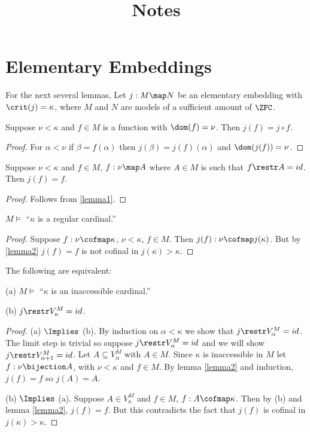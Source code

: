 \documentclass[oneside,12pt]{amsart}
\begin{document}
\title{Notes}

\maketitle

\tableofcontents

\section{Elementary Embeddings}

For the next several lemmas, Let $j:M \map N$ be an elementary embedding with $\crit(j)=\kappa$, where $M$ and $N$ are models of a sufficient amount of $\ZFC$.

\begin{lemma}
\label{lemma1}
Suppose $\nu<\kappa$ and $f\in M$ is a function with $\dom(f) = \nu$. Then $j(f) = j \circ f$.
\end{lemma}
\begin{proof}
For  $\alpha < \nu$ if $\beta = f(\alpha)$ then $j(\beta) = j(f)(\alpha)$ and $\dom(j(f)) = \nu$.
\end{proof}

\begin{lemma}
\label{lemma2}
Suppose $\nu<\kappa$ and $f\in M$, $f:\nu \map A$ where $A\in M$ is such that $f\restr A = id$.
Then $j(f) = f$.
\end{lemma}
\begin{proof}
Follows from \ref{lemma1}.
\end{proof}

\begin{lemma}
$M\models$ ``$\kappa$ is a regular cardinal.''
\end{lemma}
\begin{proof}
Suppose $f:\nu\cofmap\kappa$, $\nu < \kappa$, $f\in M$. Then $j(f) : \nu \cofmap j(\kappa)$.
But by \ref{lemma2} $j(f) = f$ is not cofinal in $j(\kappa) > \kappa$.
\end{proof}

\begin{lemma}
The following are equivalent:

(a) $M\models$ ``$\kappa$ is an inaccessible cardinal.''

(b) $j\restr V^{M}_{\kappa} = id$.
\end{lemma}
\begin{proof}
(a) $\Implies$ (b). By induction on $\alpha < \kappa$ we show that $j\restr V^{M}_{\alpha} = id$.
The limit step is trivial so suppose $j\restr V^{M}_{\alpha} = id$ and we will show
$j\restr V^{M}_{\alpha + 1} = id$. Let $A\subseteq V^{M}_{\alpha}$ with $A\in M$.
Since $\kappa$ is inaccessible in $M$ let $f:\nu\bijection A$, with $\nu < \kappa$ and
$f\in M$. By lemma \ref{lemma2} and induction, $j(f) = f$ so $j(A) = A$.

(b) $\Implies$ (a). Suppose $A\in V^{M}_{\kappa}$ and $f\in M$, $f:A \cofmap \kappa$. Then
by (b) and lemma \ref{lemma2}, $j(f) = f$. But this contradicts the fact that $j(f)$
is cofinal in $j(\kappa) > \kappa$.
\end{proof}




\end{document}
